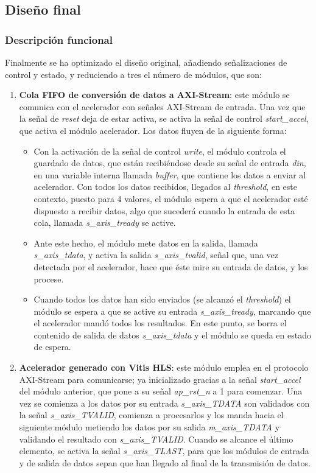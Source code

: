 \subsection{Diseño final}
\subsubsection{Descripción funcional}
Finalmente se ha optimizado el diseño original, añadiendo señalizaciones de control y estado, y reduciendo a tres el número de módulos, que son:

\begin{enumerate}
    \item \textbf{Cola FIFO de conversión de datos a AXI-Stream}: este módulo se comunica con el acelerador con señales AXI-Stream de entrada. Una vez que la señal de \emph{reset} deja de estar activa, se activa la señal de control \emph{start\_accel}, que activa el módulo acelerador. Los datos fluyen de la siguiente forma: 
    
    \begin{itemize}
        \item Con la activación de la señal de control \emph{write}, el módulo controla el guardado de datos, que están recibiéndose desde su señal de entrada \emph{din, }en una variable interna llamada \textit{buffer}, que contiene los datos a enviar al acelerador. Con todos los datos recibidos, llegados al \textit{threshold}, en este contexto, puesto para 4 valores, el módulo espera a que el acelerador esté dispuesto a recibir datos, algo que sucederá cuando la entrada de esta cola, llamada \emph{s\_axis\_tready} se active. 
        
        \item Ante este hecho, el módulo mete datos en la salida, llamada \emph{s\_axis\_tdata}, y activa la salida \emph{s\_axis\_tvalid}, señal que, una vez detectada por el acelerador, hace que éste mire su entrada de datos, y los procese. 
        
        \item Cuando todos los datos han sido enviados (se alcanzó el \textit{threshold}) el módulo se espera a que se active su entrada \emph{s\_axis\_tready}, marcando que el acelerador mandó todos los resultados. En este punto, se borra el contenido de salida de datos \emph{s\_axis\_tdata} y el módulo se queda en estado de espera.
    \end{itemize}

    \item \textbf{Acelerador generado con Vitis HLS}: este módulo emplea en el protocolo AXI-Stream para comunicarse; ya inicializado gracias a la señal \emph{start\_accel} del módulo anterior, que pone a su señal \emph{ap\_rst\_n} a 1 para comenzar. Una vez se comienza a los datos por su entrada \emph{s\_axis\_TDATA} son validados con la señal \emph{s\_axis\_TVALID}, comienza a procesarlos y los manda hacia el siguiente módulo metiendo los datos por su salida \emph{m\_axis\_TDATA} y validando el resultado con \emph{s\_axis\_TVALID}. Cuando se alcance el último elemento, se activa la señal \emph{s\_axis\_TLAST}, para que los módulos de entrada y de salida de datos sepan que han llegado al final de la transmisión de datos. 
    

\end{enumerate}
